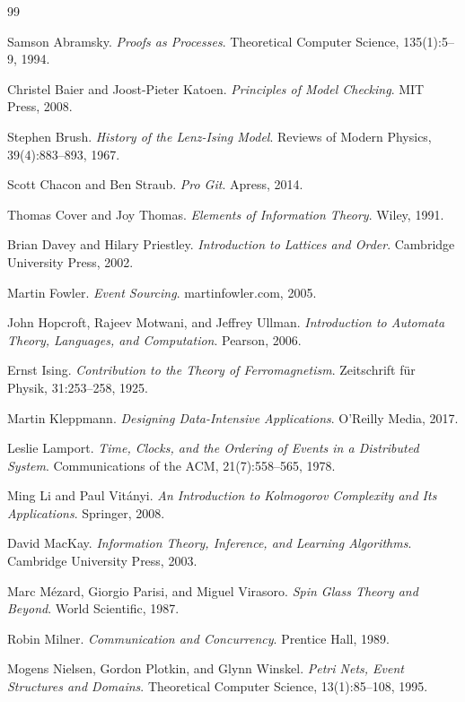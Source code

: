 \documentclass[12pt]{article}
\begin{document}
\begin{thebibliography}{99}

Samson Abramsky.
\textit{Proofs as Processes}.
Theoretical Computer Science, 135(1):5--9, 1994.

Christel Baier and Joost-Pieter Katoen.
\textit{Principles of Model Checking}.
MIT Press, 2008.

Stephen Brush.
\textit{History of the Lenz-Ising Model}.
Reviews of Modern Physics, 39(4):883--893, 1967.

Scott Chacon and Ben Straub.
\textit{Pro Git}.
Apress, 2014.

Thomas Cover and Joy Thomas.
\textit{Elements of Information Theory}.
Wiley, 1991.

Brian Davey and Hilary Priestley.
\textit{Introduction to Lattices and Order}.
Cambridge University Press, 2002.

Martin Fowler.
\textit{Event Sourcing}.
martinfowler.com, 2005.

John Hopcroft, Rajeev Motwani, and Jeffrey Ullman.
\textit{Introduction to Automata Theory, Languages, and Computation}.
Pearson, 2006.

Ernst Ising.
\textit{Contribution to the Theory of Ferromagnetism}.
Zeitschrift für Physik, 31:253--258, 1925.

Martin Kleppmann.
\textit{Designing Data-Intensive Applications}.
O'Reilly Media, 2017.

Leslie Lamport.
\textit{Time, Clocks, and the Ordering of Events in a Distributed System}.
Communications of the ACM, 21(7):558--565, 1978.

Ming Li and Paul Vitányi.
\textit{An Introduction to Kolmogorov Complexity and Its Applications}.
Springer, 2008.

David MacKay.
\textit{Information Theory, Inference, and Learning Algorithms}.
Cambridge University Press, 2003.

Marc Mézard, Giorgio Parisi, and Miguel Virasoro.
\textit{Spin Glass Theory and Beyond}.
World Scientific, 1987.

Robin Milner.
\textit{Communication and Concurrency}.
Prentice Hall, 1989.

Mogens Nielsen, Gordon Plotkin, and Glynn Winskel.
\textit{Petri Nets, Event Structures and Domains}.
Theoretical Computer Science, 13(1):85--108, 1995.


\end{thebibliography}
\end{document}
